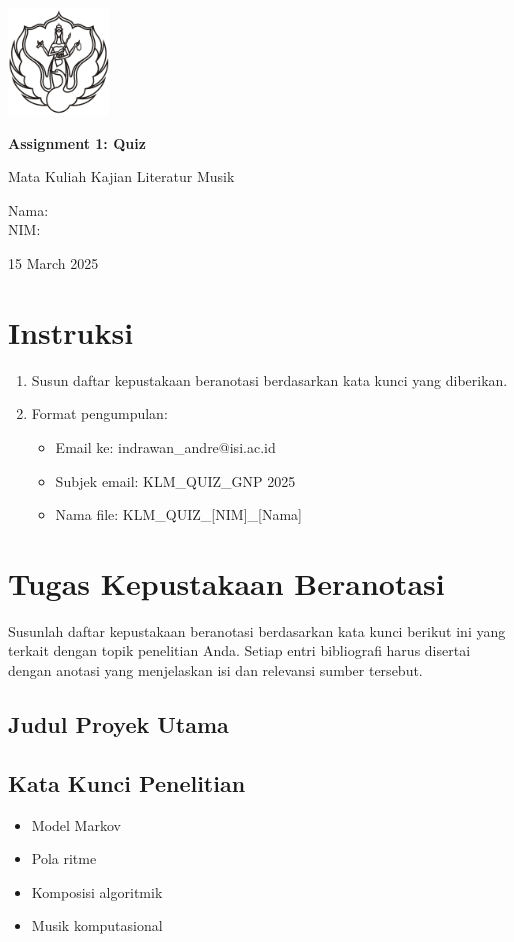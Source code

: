 \documentclass[a4paper,12pt]{article}
\newcommand{\AssignmentTitle}{Assignment 1: Quiz}
\renewcommand{\maketitle}{
  \begin{titlepage}
    \centering
    \includegraphics[width=0.2\textwidth]{../images/logo.png}\par\vspace{1cm}
    {\Huge\bfseries \AssignmentTitle}\par\vspace{0.5em}
    {\Large Mata Kuliah Kajian Literatur Musik}\par\vspace{2cm}
    {\large Nama: \AuthorName\\NIM: \AuthorNIM}\par\vspace{1cm}
    {\large 15 March 2025}\par
  \end{titlepage}
}
\begin{document}
\maketitle

\section*{Instruksi}
\begin{enumerate}[label=\arabic*.]
    \item Susun daftar kepustakaan beranotasi berdasarkan kata kunci yang diberikan.
    \item Format pengumpulan:
    \begin{itemize}
        \item Email ke: indrawan\_andre@isi.ac.id
        \item Subjek email: KLM\_QUIZ\_GNP 2025
        \item Nama file: KLM\_QUIZ\_[NIM]\_[Nama]
    \end{itemize}
\end{enumerate}

\section*{Tugas Kepustakaan Beranotasi}
Susunlah daftar kepustakaan beranotasi berdasarkan kata kunci berikut ini yang terkait dengan topik penelitian Anda. Setiap entri bibliografi harus disertai dengan anotasi yang menjelaskan isi dan relevansi sumber tersebut.

\subsection*{Judul Proyek Utama}
\ThesisTitle

\subsection*{Kata Kunci Penelitian}
\begin{itemize}
    \item Model Markov
    \item Pola ritme
    \item Komposisi algoritmik
    \item Musik komputasional
\end{itemize}

\vspace{1cm}
\end{document}
